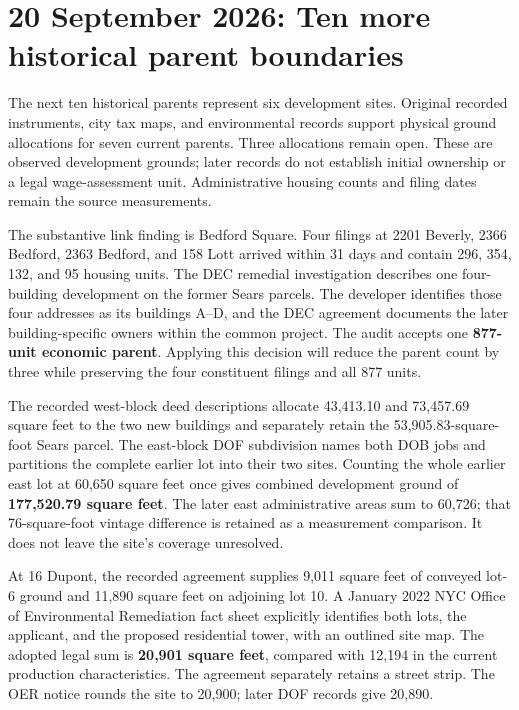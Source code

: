 \clearpage
\section{20 September 2026: Ten more historical parent boundaries}

The next ten historical parents represent six development sites. Original
recorded instruments, city tax maps, and environmental records support physical
ground allocations for seven current parents. Three allocations remain open.
These are observed development grounds; later records do not establish initial
ownership or a legal wage-assessment unit. Administrative housing counts and
filing dates remain the source measurements.

The substantive link finding is Bedford Square. Four filings at 2201 Beverly,
2366 Bedford, 2363 Bedford, and 158 Lott arrived within 31 days and contain
296, 354, 132, and 95 housing units. The DEC remedial investigation describes one
four-building development on the former Sears parcels. The developer identifies
those four addresses as its buildings A--D, and the DEC agreement documents the
later building-specific owners within the common project. The audit accepts
one \textbf{877-unit economic parent}. Applying this decision will reduce the
parent count by three while preserving the four constituent filings and all
877 units.

The recorded west-block deed descriptions allocate 43,413.10 and 73,457.69
square feet to the two new buildings and separately retain the 53,905.83-square-foot
Sears parcel. The east-block DOF subdivision names both DOB jobs and partitions
the complete earlier lot into their two sites. Counting the whole earlier east
lot at 60,650 square feet once gives combined development ground of
\textbf{177,520.79 square feet}. The later east administrative areas sum to
60,726; that 76-square-foot vintage difference is retained as a measurement
comparison. It does not leave the site's coverage unresolved.

At 16 Dupont, the recorded agreement supplies 9,011 square feet of conveyed
lot-6 ground and 11,890 square feet on adjoining lot 10. A January 2022 NYC
Office of Environmental Remediation fact sheet explicitly identifies both lots,
the applicant, and the proposed residential tower, with an outlined site map.
The adopted legal sum is \textbf{20,901 square feet}, compared with 12,194 in the
current production characteristics. The agreement separately retains a street
strip. The OER notice rounds the site to 20,900; later DOF records give 20,890.

